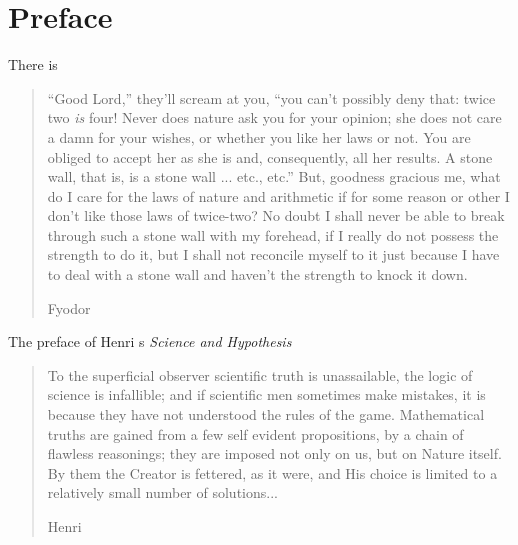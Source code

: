 
\newcommand{\txtincludes}{\ \textrm{includes}\ }
\newcommand{\txtcovers}{ \ \textit{covers}\ }
\newcommand{\statement}[1]{\textit{#1}}
\newcommand{\covered}{\prec}
\newcommand{\aesthetic}{{\ae}sthetic}
\newcommand{\aesthetics}{\aesthetic s}
\newcommand{\telos}{telos} %
\chapter*{Preface}\label{ch:mysticism}

There is 

\begin{quote}
 ``Good Lord,'' they'll scream at you, ``you can't possibly deny that:
 twice two {\em is} four! Never does nature ask you for your opinion;
 she does not care a damn for your wishes, or whether you like her laws
 or not. 
 You are obliged to accept her as she is and, consequently, all her
 results.  A stone wall, that is, is a stone wall ... etc., etc.''
 But, goodness gracious me, what do I care for the laws of nature and
 arithmetic if for some reason or other I don't like those laws of
 twice-two?
 No doubt I shall never be able to break through such a stone wall with
 my forehead, if I really do not possess the strength to do it, but I
 shall not reconcile myself to it just because I have to deal with a
 stone wall and haven't the strength to knock it down. 

 \hfill Fyodor \cite*{DostoevskyQuote}
\end{quote}

The preface of Henri \Poincare s {\em Science and Hypothesis} 

\begin{quote}
 To the superficial observer scientific truth is unassailable,
 the logic of science is infallible;
 and if scientific men sometimes make mistakes,
 it is because they have not understood the rules of the game.
 Mathematical truths are gained from a few self evident propositions,
 by a chain of flawless reasonings; they are imposed not only on us, but on Nature itself.
 By them the Creator is fettered, as it were, and His choice is limited to a relatively small number of solutions...

 \hfill Henri \Poincare \cite*{Science and Hypothesis}
\end{quote}





